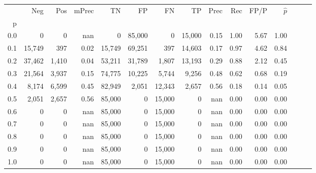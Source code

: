 \begin{tabular}{rrrrrrrrrrrrrrr}
\toprule
{} &     Neg &    Pos & mPrec &      TN &      FP &      FN &      TP &  Prec &   Rec &  FP/P & $\hat{p}$ \\
p   &         &        &       &         &         &         &         &       &       &       &           \\
\midrule
0.0 &       0 &      0 &   nan &       0 &  85,000 &       0 &  15,000 &  0.15 &  1.00 &  5.67 &      1.00 \\
0.1 &  15,749 &    397 &  0.02 &  15,749 &  69,251 &     397 &  14,603 &  0.17 &  0.97 &  4.62 &      0.84 \\
0.2 &  37,462 &  1,410 &  0.04 &  53,211 &  31,789 &   1,807 &  13,193 &  0.29 &  0.88 &  2.12 &      0.45 \\
0.3 &  21,564 &  3,937 &  0.15 &  74,775 &  10,225 &   5,744 &   9,256 &  0.48 &  0.62 &  0.68 &      0.19 \\
0.4 &   8,174 &  6,599 &  0.45 &  82,949 &   2,051 &  12,343 &   2,657 &  0.56 &  0.18 &  0.14 &      0.05 \\
0.5 &   2,051 &  2,657 &  0.56 &  85,000 &       0 &  15,000 &       0 &   nan &  0.00 &  0.00 &      0.00 \\
0.6 &       0 &      0 &   nan &  85,000 &       0 &  15,000 &       0 &   nan &  0.00 &  0.00 &      0.00 \\
0.7 &       0 &      0 &   nan &  85,000 &       0 &  15,000 &       0 &   nan &  0.00 &  0.00 &      0.00 \\
0.8 &       0 &      0 &   nan &  85,000 &       0 &  15,000 &       0 &   nan &  0.00 &  0.00 &      0.00 \\
0.9 &       0 &      0 &   nan &  85,000 &       0 &  15,000 &       0 &   nan &  0.00 &  0.00 &      0.00 \\
1.0 &       0 &      0 &   nan &  85,000 &       0 &  15,000 &       0 &   nan &  0.00 &  0.00 &      0.00 \\
\bottomrule
\end{tabular}
